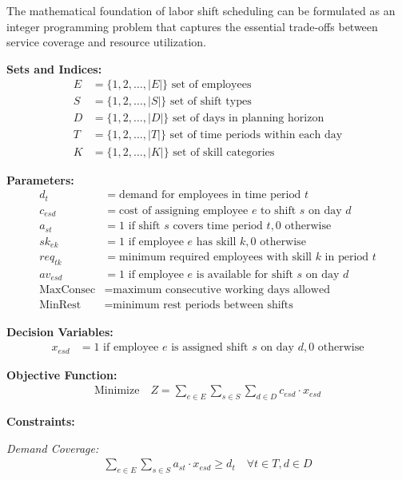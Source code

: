 \documentclass{article}
\begin{document}
The mathematical foundation of labor shift scheduling can be formulated as an integer programming problem that captures the essential trade-offs between service coverage and resource utilization.

\textbf{Sets and Indices:}
\begin{align}
E &= \{1, 2, \ldots, |E|\} \text{ set of employees} \\
S &= \{1, 2, \ldots, |S|\} \text{ set of shift types} \\
D &= \{1, 2, \ldots, |D|\} \text{ set of days in planning horizon} \\
T &= \{1, 2, \ldots, |T|\} \text{ set of time periods within each day} \\
K &= \{1, 2, \ldots, |K|\} \text{ set of skill categories}
\end{align}

\textbf{Parameters:}
\begin{align}
d_{t} &= \text{demand for employees in time period } t \\
c_{esd} &= \text{cost of assigning employee } e \text{ to shift } s \text{ on day } d \\
a_{st} &= 1 \text{ if shift } s \text{ covers time period } t, 0 \text{ otherwise} \\
sk_{ek} &= 1 \text{ if employee } e \text{ has skill } k, 0 \text{ otherwise} \\
req_{tk} &= \text{minimum required employees with skill } k \text{ in period } t \\
av_{esd} &= 1 \text{ if employee } e \text{ is available for shift } s \text{ on day } d \\
\text{MaxConsec} &= \text{maximum consecutive working days allowed} \\
\text{MinRest} &= \text{minimum rest periods between shifts}
\end{align}

\textbf{Decision Variables:}
\begin{align}
x_{esd} &= 1 \text{ if employee } e \text{ is assigned shift } s \text{ on day } d, 0 \text{ otherwise}
\end{align}

\textbf{Objective Function:}
\begin{align}
\text{Minimize} \quad Z = \sum_{e \in E} \sum_{s \in S} \sum_{d \in D} c_{esd} \cdot x_{esd}
\end{align}

\textbf{Constraints:}

\textit{Demand Coverage:}
\begin{align}
\sum_{e \in E} \sum_{s \in S} a_{st} \cdot x_{esd} \geq d_{t} \quad \forall t \in T, d \in D
\end{align}
\end{document}
